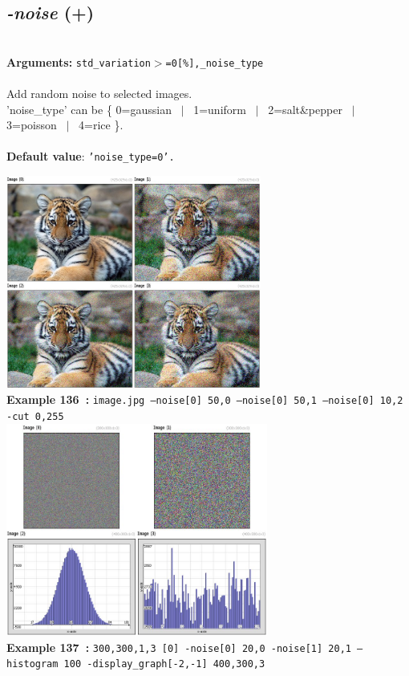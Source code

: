 \documentclass[a4paper,11pt,twoside]{book}
\begin{document}
\subsection{\emph{-noise} (+)}\vspace*{-0.5em}
~\\\textbf{Arguments: } 
{\small \texttt{std\_variation$>$=0[\%],\_noise\_type}}\\~\\
Add random noise to selected images.
~\\'noise\_type' can be \{ 0=gaussian ~$|$~ 1=uniform ~$|$~ 2=salt\&pepper ~$|$~ 3=poisson ~$|$~ 4=rice \}.
~\\~\\\textbf{Default value}: {\small \texttt{'noise\_type=0'.}}
\begin{center}\includegraphics[keepaspectratio=true,height=7cm,width=\textwidth]{img/gmic_def136.jpg}\\
{\footnotesize \textbf{Example 136~:} \texttt{image.jpg --noise[0] 50,0 --noise[0] 50,1 --noise[0] 10,2 -cut 0,255}}
\\\includegraphics[keepaspectratio=true,height=7cm,width=\textwidth]{img/gmic_def137.jpg}\\
{\footnotesize \textbf{Example 137~:} \texttt{300,300,1,3 [0] -noise[0] 20,0 -noise[1] 20,1 --histogram 100 -display\_graph[-2,-1] 400,300,3}}
\end{center}
\end{document}
